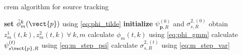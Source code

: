 \begin{algorithm}[H]
\caption{\acrshort{crem} algorithm for source tracking}
\label{alg:crem}
\begin{algorithmic}
\State \textbf{set} $\tilde\phi^k_m(\vect{p})$ using \eqref{eq:phi_tilde}
\State \textbf{initialize} $\psi_{\bm p, R}^{(0)}$ and $\sigma_{s,R}^{2,(0)}$
\State obtain $z_m^1(t,k), z_m^2(t,k)\ \forall\ k,m$
\State calculate $\phi_m(t,k)$ using \eqref{eq:phi_gmm}
\State calculate $\psi^{(t)}_{s\vect{p},R}$ using \eqref{eq:m_step_psi}
\State calculate $\sigma^{2,(t)}_{s,R}$ using \eqref{eq:m_step_var}
\EndFor
\end{algorithmic}
\end{algorithm}